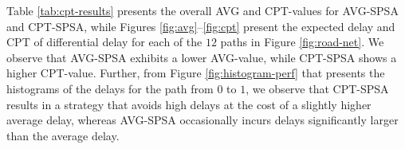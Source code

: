 Table \ref{tab:cpt-results} presents the overall AVG and CPT-values for AVG-SPSA and CPT-SPSA, while Figures \ref{fig:avg}--\ref{fig:cpt} present the expected delay and CPT of differential delay for each of the $12$ paths in Figure \ref{fig:road-net}.  
We observe that AVG-SPSA exhibits a lower AVG-value, while CPT-SPSA shows a higher CPT-value. 
Further, from Figure \ref{fig:histogram-perf} that presents the histograms of the delays for the path from $0$ to $1$, we observe that CPT-SPSA results in a strategy that avoids high delays at the cost of a slightly higher average delay, whereas AVG-SPSA occasionally incurs delays significantly larger than the average delay. 



